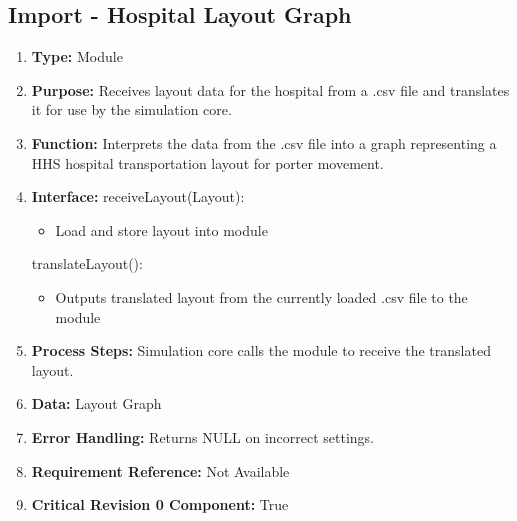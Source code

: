 \documentclass[paper=letter, fontsize=10pt]{scrartcl}
\numberwithin{equation}{section}		%
\numberwithin{figure}{section}			%
\numberwithin{table}{section}				%
\begin{document}
\subsection{Import - Hospital Layout Graph}
\begin{enumerate}[] 
	\item \textbf{Type:} Module
	\item \textbf{Purpose:} Receives layout data for the hospital from a .csv file and translates it for use by the simulation core.
	\item \textbf{Function:} Interprets the data from the .csv file into a graph representing a HHS hospital transportation layout for porter movement.
	\item \textbf{Interface:} \newline
	receiveLayout(Layout):
	 	\begin{itemize}
	 		\item Load and store layout into module
	 	\end{itemize}
	 translateLayout():
	 	\begin{itemize}
	 		\item Outputs translated layout from the currently loaded .csv file to the module
	 	\end{itemize}
	\item \textbf{Process Steps:} Simulation core calls the module to receive the translated layout.
	\item \textbf{Data:} Layout Graph
	\item \textbf{Error Handling:} Returns NULL on incorrect settings.
	\item \textbf{Requirement Reference:} Not Available
	\item \textbf{Critical Revision 0 Component:} True
\end{enumerate}
\end{document}
